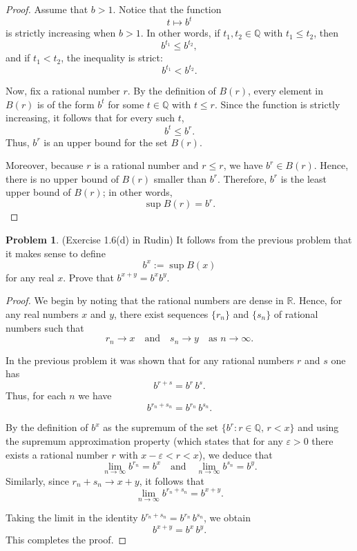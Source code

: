 \documentclass[12pt,oneside]{article}
\theoremstyle{definition}
\newtheorem{problem}{Problem}
\begin{document}
\begin{proof}
    Assume that $b>1$. Notice that the function
    \[
    t \mapsto b^t
    \]
    is strictly increasing when $b>1$. In other words, if $t_1, t_2 \in \mathbb{Q}$ with $t_1 \le t_2$, then
    \[
    b^{t_1} \le b^{t_2},
    \]
    and if $t_1 < t_2$, the inequality is strict:
    \[
    b^{t_1} < b^{t_2}.
    \]
    
    Now, fix a rational number $r$. By the definition of $B(r)$, every element in $B(r)$ is of the form $b^t$ for some $t \in \mathbb{Q}$ with $t \le r$. Since the function is strictly increasing, it follows that for every such $t$, 
    \[
    b^t \le b^r.
    \]
    Thus, $b^r$ is an upper bound for the set $B(r)$.
    
    Moreover, because $r$ is a rational number and $r\le r$, we have $b^r \in B(r)$. Hence, there is no upper bound of $B(r)$ smaller than $b^r$. Therefore, $b^r$ is the least upper bound of $B(r)$; in other words,
    \[
    \sup B(r)=b^r.
    \]
    \end{proof}






\newpage
\begin{problem}
(Exercise 1.6(d) in Rudin)
It follows from the previous problem that it makes sense to define
\[
b^x := \sup B(x)
\]
for any real $x$. 
Prove that $b^{x+y} = b^x b^y$. 
\end{problem}


\begin{proof}
    We begin by noting that the rational numbers are dense in \(\mathbb{R}\). Hence, for any real numbers \(x\) and \(y\), there exist sequences \(\{r_n\}\) and \(\{s_n\}\) of rational numbers such that
    \[
    r_n \to x \quad \text{and} \quad s_n \to y \quad \text{as } n \to \infty.
    \]
    
    In the previous problem it was shown that for any rational numbers \(r\) and \(s\) one has
    \[
    b^{r+s} = b^r\, b^s.
    \]
    Thus, for each \(n\) we have
    \[
    b^{r_n+s_n} = b^{r_n}\, b^{s_n}.
    \]
    
    By the definition of \(b^x\) as the supremum of the set \(\{b^r : r \in \mathbb{Q},\, r < x\}\) and using the supremum approximation property (which states that for any \(\varepsilon>0\) there exists a rational number \(r\) with \(x-\varepsilon < r < x\)), we deduce that
    \[
    \lim_{n\to\infty} b^{r_n} = b^x \quad \text{and} \quad \lim_{n\to\infty} b^{s_n} = b^y.
    \]
    Similarly, since \(r_n+s_n\to x+y\), it follows that
    \[
    \lim_{n\to\infty} b^{r_n+s_n} = b^{x+y}.
    \]
    
    Taking the limit in the identity \(b^{r_n+s_n} = b^{r_n}\, b^{s_n}\), we obtain
    \[
    b^{x+y} = b^x\, b^y.
    \]
    This completes the proof.
    \end{proof}
    

    
\end{document}
